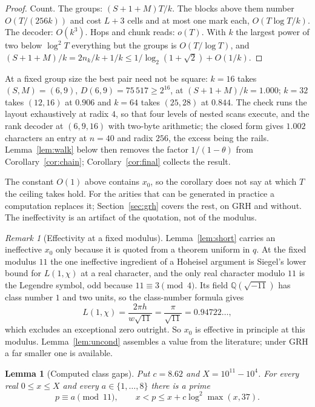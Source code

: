 \documentclass[11pt]{article}
\newtheorem{lemma}[theorem]{Lemma}
\theoremstyle{remark}
\newtheorem{remark}[theorem]{Remark}
\begin{document}
\begin{proof}
Count.  The groups: $(S+1+M)T/k$.  The blocks above them number
$O(T/(256k))$ and cost $L+3$ cells and at most one mark each,
$O(T\log T/k)$.  The decoder: $O(k^3)$.  Hops and chunk reads: $o(T)$.
With $k$ the largest power of two below $\log^2T$ everything but the groups
is $O(T/\log T)$, and $(S+1+M)/k=2n_k/k+1/k\le1/\log_2(1+\sqrt2)+O(1/k)$.
\end{proof}

At a fixed group size the best pair need not be square: $k=16$ takes
$(S,M)=(6,9)$, $D(6,9)=75\,517\ge2^{16}$, at $(S+1+M)/k=1.000$; $k=32$
takes $(12,16)$ at $0.906$ and $k=64$ takes $(25,28)$ at $0.844$.  The
check runs the layout exhaustively at radix $4$, so that four levels of
nested scans execute, and the rank decoder at $(6,9,16)$ with two-byte
arithmetic; the closed form gives $1.002$ characters an entry at $n=40$ and
radix $256$, the excess being the rails.  Lemma~\ref{lem:walk} below then
removes the factor $1/(1-\theta)$ from Corollary~\ref{cor:chain};
Corollary~\ref{cor:final} collects the result.

The constant $O(1)$ above contains $x_0$, so the corollary does not say at
which $T$ the ceiling takes hold.  For the arities that can be generated in
practice a computation replaces it; Section~\ref{sec:grh} covers the rest,
on GRH and without.  The ineffectivity is an artifact of the quotation, not
of the modulus.

\begin{remark}[Effectivity at a fixed modulus]\label{rem:effective}
Lemma~\ref{lem:short} carries an ineffective $x_0$ only because it is quoted
from a theorem uniform in $q$.  At the fixed modulus $11$ the one ineffective
ingredient of a Hoheisel argument is Siegel's lower bound for $L(1,\chi)$ at a
real character, and the only real character modulo $11$ is the Legendre
symbol, odd because $11\equiv3\pmod 4$.  Its field $\mathbb Q(\sqrt{-11})$ has
class number $1$ and two units, so the class-number formula gives
\[
  L(1,\chi)=\frac{2\pi h}{w\sqrt{11}}=\frac{\pi}{\sqrt{11}}=0.94722\ldots,
\]
which excludes an exceptional zero outright.  So $x_0$ is effective in
principle at this modulus.  Lemma~\ref{lem:uncond} assembles a value from
the literature; under GRH a far smaller one is available.
\end{remark}

\begin{lemma}[Computed class gaps]\label{lem:computed}
Put $c=8.62$ and $X=10^{11}-10^4$.  For every real $0\le x\le X$ and every
$a\in\{1,\ldots,8\}$ there is a prime
\[
  p\equiv a\pmod{11},
  \qquad x<p\le x+c\log^2\max(x,37).
\]
\end{lemma}
\end{document}

